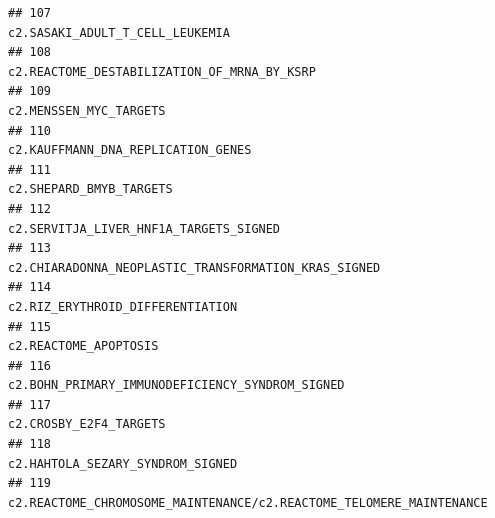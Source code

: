 \documentclass{article}\usepackage[]{graphicx}\usepackage[]{color}
\makeatletter
\newenvironment{kframe}{%
 \def\at@end@of@kframe{}%
 \ifinner\ifhmode%
  \def\at@end@of@kframe{\end{minipage}}%
  \begin{minipage}{\columnwidth}%
 \fi\fi%
 \def\FrameCommand##1{\hskip\@totalleftmargin \hskip-\fboxsep
 \colorbox{shadecolor}{##1}\hskip-\fboxsep
     \hskip-\linewidth \hskip-\@totalleftmargin \hskip\columnwidth}%
 \MakeFramed {\advance\hsize-\width
   \@totalleftmargin\z@ \linewidth\hsize
   \@setminipage}}%
 {\par\unskip\endMakeFramed%
 \at@end@of@kframe}
\newenvironment{knitrout}{}{} %
\makeatother
\begin{document}
\begin{knitrout}
\begin{kframe}
\begin{verbatim}
## 107                                                                                                                                                                                  c2.SASAKI_ADULT_T_CELL_LEUKEMIA
## 108                                                                                                                                                                      c2.REACTOME_DESTABILIZATION_OF_MRNA_BY_KSRP
## 109                                                                                                                                                                                           c2.MENSSEN_MYC_TARGETS
## 110                                                                                                                                                                               c2.KAUFFMANN_DNA_REPLICATION_GENES
## 111                                                                                                                                                                                          c2.SHEPARD_BMYB_TARGETS
## 112                                                                                                                                                                           c2.SERVITJA_LIVER_HNF1A_TARGETS_SIGNED
## 113                                                                                                                                                             c2.CHIARADONNA_NEOPLASTIC_TRANSFORMATION_KRAS_SIGNED
## 114                                                                                                                                                                                 c2.RIZ_ERYTHROID_DIFFERENTIATION
## 115                                                                                                                                                                                            c2.REACTOME_APOPTOSIS
## 116                                                                                                                                                                  c2.BOHN_PRIMARY_IMMUNODEFICIENCY_SYNDROM_SIGNED
## 117                                                                                                                                                                                           c2.CROSBY_E2F4_TARGETS
## 118                                                                                                                                                                                 c2.HAHTOLA_SEZARY_SYNDROM_SIGNED
## 119                                                                                                                                              c2.REACTOME_CHROMOSOME_MAINTENANCE/c2.REACTOME_TELOMERE_MAINTENANCE

\end{verbatim}
\end{kframe}
\end{knitrout}
\end{document}
